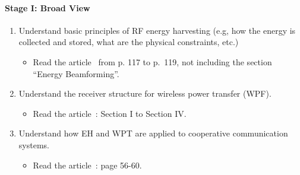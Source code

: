\documentclass[12pt]{article}%
\begin{document}
\paragraph{Stage I: Broad View}%
\begin{enumerate}
\item Understand basic principles of RF energy harvesting (e.g, how the energy is collected and stored, what
are the physical constraints, etc.)
 \begin{itemize}
 \item Read the article~\cite{Bi2015} from p. 117 to p.~119, not
 including the section ``Energy Beamforming''.
 \end{itemize}
\item Understand the receiver structure for wireless power transfer
(WPF).
 \begin{itemize}
  \item Read the article~\cite{Krikidis2014}: Section I to Section
  IV.
 \end{itemize}
\item Understand how EH and WPT are applied to cooperative
communication systems.
 \begin{itemize}
 \item Read the article~\cite{Liu2015}: page 56-60.
 \end{itemize}
\end{enumerate}

%
\end{document}
